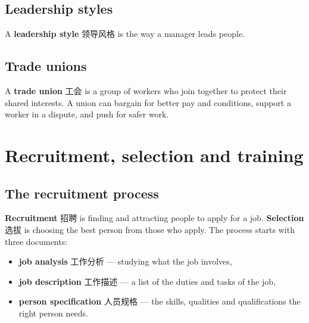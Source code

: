 \documentclass[11pt]{article}
\begin{document}
\subsection*{Leadership styles}

A \textbf{leadership style} 领导风格 is the way a manager leads people.

\begin{center}
\end{center}

\subsection*{Trade unions}

A \textbf{trade union} 工会 is a group of workers who join together to protect their shared interests. A union can bargain for better pay and conditions, support a worker in a dispute, and push for safer work.

\section*{Recruitment, selection and training}

\subsection*{The recruitment process}

\textbf{Recruitment} 招聘 is finding and attracting people to apply for a job. \textbf{Selection} 选拔 is choosing the best person from those who apply. The process starts with three documents:

\begin{itemize}
\item \textbf{job analysis} 工作分析 — studying what the job involves,

\item \textbf{job description} 工作描述 — a list of the duties and tasks of the job,

\item \textbf{person specification} 人员规格 — the skills, qualities and qualifications the right person needs.

\end{itemize}
\end{document}
